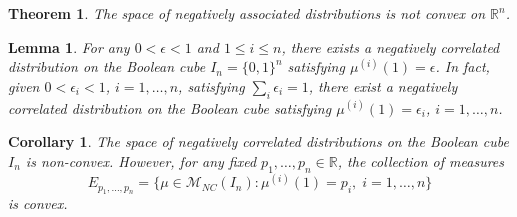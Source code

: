 \documentclass[10pt,a4paper]{amsart}
\newtheorem{lemma}{Lemma}
\newtheorem{thm}{Theorem}
\newtheorem{cor}{Corollary}
\newcommand{\R}{\mathbb{R}}
\newcommand{\m}{\mathcal{M}}
\begin{document}
\begin{thm}\label{convexNA}
The space of negatively associated
distributions is not convex on $\R^n$. 
\end{thm}

\begin{lemma}\label{NCmarginal}
For any $0<\epsilon<1$ and $1\leq i\leq n$, there exists a negatively correlated  distribution on the Boolean cube $I_n=\{0,1\}^n$ satisfying $\mu^{(i)}(1)=\epsilon$. In fact, given $0<\epsilon_i<1$, $i=1,\dots, n$, satisfying $\sum_i \epsilon_i=1$, there exist a negatively correlated distribution on the Boolean cube satisfying $\mu^{(i)}(1)= \epsilon_i$, $i=1,\dots, n$.
\end{lemma}

\begin{cor}
The space of negatively correlated distributions on the Boolean cube $I_n$ is non-convex. However, for any fixed $p_1,\dots, p_n \in \R$, the collection of measures
\[
E_{p_1,\dots, p_n} = \{\mu\in \m_{NC}(I_n) : \mu^{(i)}(1) = p_i, \; i=1,\dots, n\}
\]
is convex.
\end{cor}
\end{document}
